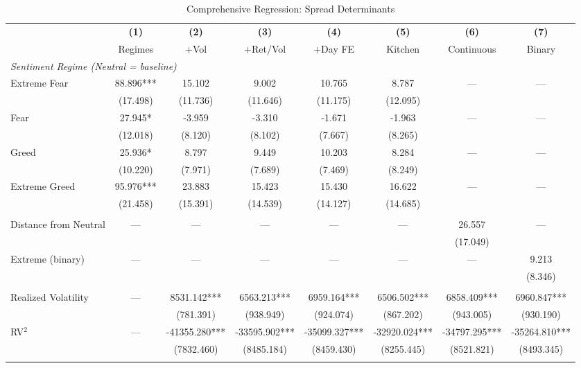 \begin{table}[htbp]
\centering
\caption{Comprehensive Regression: Spread Determinants}
\label{tab:kitchen_sink}
\small
\begin{tabular}{@{}lccccccc@{}}
\toprule
& \textbf{(1)} & \textbf{(2)} & \textbf{(3)} & \textbf{(4)} & \textbf{(5)} & \textbf{(6)} & \textbf{(7)} \\
& Regimes & +Vol & +Ret/Vol & +Day FE & Kitchen & Continuous & Binary \\
\midrule
\multicolumn{8}{l}{\textit{Sentiment Regime (Neutral = baseline)}} \\
Extreme Fear & 88.896*** & 15.102 & 9.002 & 10.765 & 8.787 & --- & --- \\
 & (17.498) & (11.736) & (11.646) & (11.175) & (12.095) & & \\
Fear & 27.945* & -3.959 & -3.310 & -1.671 & -1.963 & --- & --- \\
 & (12.018) & (8.120) & (8.102) & (7.667) & (8.265) & & \\
Greed & 25.936* & 8.797 & 9.449 & 10.203 & 8.284 & --- & --- \\
 & (10.220) & (7.971) & (7.689) & (7.469) & (8.249) & & \\
Extreme Greed & 95.976*** & 23.883 & 15.423 & 15.430 & 16.622 & --- & --- \\
 & (21.458) & (15.391) & (14.539) & (14.127) & (14.685) & & \\
\addlinespace
\multicolumn{8}{l}{\textit{Alternative Extremity Measures}} \\
Distance from Neutral & --- & --- & --- & --- & --- & 26.557 & --- \\
 & & & & & & (17.049) & \\
Extreme (binary) & --- & --- & --- & --- & --- & --- & 9.213 \\
 & & & & & & & (8.346) \\
\addlinespace
\multicolumn{8}{l}{\textit{Volatility Controls}} \\
Realized Volatility & --- & 8531.142*** & 6563.213*** & 6959.164*** & 6506.502*** & 6858.409*** & 6960.847*** \\
 & & (781.391) & (938.949) & (924.074) & (867.202) & (943.005) & (930.190) \\
RV$^2$ & --- & -41355.280*** & -33595.902*** & -35099.327*** & -32920.024*** & -34797.295*** & -35264.810*** \\
 & & (7832.460) & (8485.184) & (8459.430) & (8255.445) & (8521.821) & (8493.345) \\
\addlinespace
\multicolumn{8}{l}{\textit{Additional Controls}} \\

\end{tabular}
\end{table}
